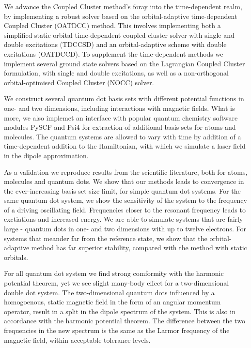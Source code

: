 We advance the Coupled Cluster method's foray into the time-dependent realm, 
by implementing a robust solver based on the orbital-adaptive time-dependent 
Coupled Cluster (OATDCC)\cite{kvaal2012ab} method.
This involves implementing both a simplified static
orbital time-dependent coupled cluster solver with single and double excitations 
(TDCCSD) and an orbital-adaptive scheme with double excitations (OATDCCD).
To supplement the time-dependent methods we implement several ground state 
solvers based on the Lagrangian Coupled Cluster formulation, with single and double 
excitations, as well as a non-orthogonal orbital-optimised Coupled Cluster (NOCC)
solver\cite{myhre2018demonstrating}.

We construct several quantum dot basis sets with different potential functions
in one- and two dimensions, including interactions with magnetic fields.
What is more, we also implemet an 
interface with popular quantum chemistry software modules PySCF\cite{PYSCF}
and Psi4\cite{parrish2017psi4} for extraction of additional 
basis sets for atoms and molecules. The quantum systems are allowed to vary with time 
by addition of a time-dependent addition to the Hamiltonian, with which we simulate 
a laser field in the dipole approximation.

As a validation we reproduce results from the scientific literature, both for 
atoms, molecules and quantum dots. We show that our methods leads to convergence in 
the ever-increasing basis set size limit, for simple quantum dot systems. For the 
same quantum dot system, we show the sensitivity of the system to the frequency of 
a driving oscillating field. Frequencies closer to the resonant frequency 
leads to exctiations and increased energy. We are able to simulate systems that 
are fairly large - quantum dots in one- and two dimensions with up to twelve 
electrons. For systems that meander far from the reference state, we show that 
the orbital-adaptive method has far superior stability, compared with the 
method with static orbitals.

For all quantum dot system we find 
strong comformity with the harmonic potential theorem\cite{kohn1961cyclotron},
yet we see slight many-body 
effect for a two-dimensional double dot system. The two-dimensional quantum dots 
influenced by a homogoenous, static magnetic field in the form of an angular 
momentum operator, result in a split in the dipole spectrum of the system. This
is also in accordance with the harmonic potential theorem.
The difference between the two frequencies in the new spectrum is the same as the
Larmor frequency of the magnetic field, within acceptable tolerance levels. 